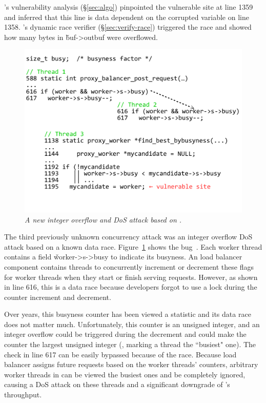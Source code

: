 \xxx's vulnerability analysis (\S\ref{sec:algo}) pinpointed the vulnerable site 
at line 1359 and inferred that this line is data dependent on the corrupted 
variable on line 1358. \xxx's dynamic race verifier (\S\ref{sec:verify-race}) 
triggered the race and showed how many bytes in
\v{buf->outbuf} were overflowed.

\begin{figure}[h]
\centering
\vspace{-.15in}
\includegraphics[width=0.85\columnwidth]{figures/apache-46215}
\vspace{-.4in}
\caption{{\em A new integer overflow and DoS attack based on .}} 
\label{fig:apache-46215}
\vspace{-.1in}
\end{figure}

The third previously unknown concurrency attack was an integer overflow DoS 
attack based on a known  data race. Figure~\ref{fig:apache-46215} 
shows the  bug~\cite{apache-bug-46215}. Each \apache worker thread 
contains a field \v{worker->s->busy} to indicate its busyness. An \apache 
load balancer component contains threads to concurrently increment or decrement 
these flags for worker threads when they start or finish serving requests. 
However, as shown in line 616, this is a data race because developers forgot to 
use a lock during the counter increment and decrement.

Over years, this busyness counter has been viewed a statistic and its 
data race does not matter much. Unfortunately, this counter is an unsigned 
integer, and an integer overflow could be triggered during the decrement and 
could make the counter the largest unsigned integer (\ie, marking a thread the 
``busiest" one). The check in line 617 can be easily bypassed because of the 
race. Because load balancer assigns future requests based on the worker 
threads' counters, arbitrary worker threads in \apache can be viewed the 
busiest ones and be completely ignored, causing a DoS attack on these threads 
and a significant downgrade of \apache's throughput.

